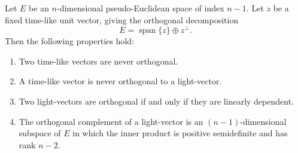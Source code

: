 Let $E$ be an $n$-dimensional pseudo-Euclidean space of index $n-1$. Let $z$ be a fixed time-like unit vector, giving the orthogonal decomposition
$$E = \operatorname{span}\{z\} \oplus z^\perp.$$
Then the following properties hold:

\begin{enumerate}
  \item Two time-like vectors are never orthogonal.
  \item A time-like vector is never orthogonal to a light-vector.
  \item Two light-vectors are orthogonal if and only if they are linearly dependent.
  \item The orthogonal complement of a light-vector is an $(n-1)$-dimensional subspace of $E$ in which the inner product is positive semidefinite and has rank $n-2$.
\end{enumerate}
